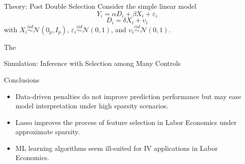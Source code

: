 \documentclass{beamer}
\begin{document}
\begin{frame}{Theory: Post Double Selection}
Consider the simple linear model
\[Y_i = \alpha D_i + \beta X_i + \varepsilon_i\]
\[D_i = \delta X_i + \upsilon_i\]
with \(X_i \stackrel{iid}{\sim} \mathcal{N}(0_p,I_p)\), \(\varepsilon_i \stackrel{iid}{\sim} \mathcal{N}(0,1)\), and \(\upsilon_i \stackrel{iid}{\sim} \mathcal{N}(0,1)\).

The 
\end{frame}

\begin{frame}{Simulation: Inference with Selection among Many Controls}
	
\end{frame}



\begin{frame} {Conclusions}
\begin{itemize}
\item Data-driven penalties do not improve prediction performance but may ease model interpretation under high sparsity scenarios.
\item Lasso improves the process of feature selection in Labor Economics under approximate sparsity.  
\item ML learning algorithms seem  ill-suited for IV applications in Labor Economics.
\end{itemize}
\end{frame}
\end{document}
